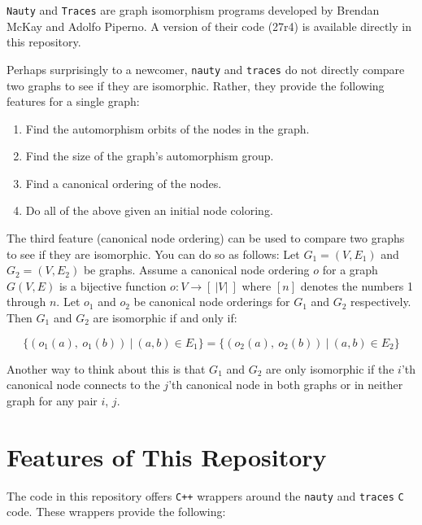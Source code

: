 \documentclass{article}
\begin{document}
\verb|Nauty| and \verb|Traces| are graph isomorphism programs developed by Brendan McKay and Adolfo Piperno. A version of their code (27r4) is available directly in this repository.

Perhaps surprisingly to a newcomer, \verb|nauty| and \verb|traces| do not directly compare two graphs to see if they are isomorphic. Rather, they provide the following features for a single graph:

\begin{enumerate}
    \item Find the automorphism orbits of the nodes in the graph.
    \item Find the size of the graph's automorphism group.
    \item Find a canonical ordering of the nodes.
    \item Do all of the above given an initial node coloring.
\end{enumerate}

The third feature (canonical node ordering) can be used to compare two graphs to see if they are isomorphic. You can do so as follows: Let $G_1 = (V, E_1)$ and $G_2 = (V, E_2)$ be graphs. Assume a canonical node ordering $o$ for a graph $G(V, E)$ is a bijective function $o: V \rightarrow [\ |V|\ ]$ where $[n]$ denotes the numbers 1 through $n$. Let $o_1$ and $o_2$ be canonical node orderings for $G_1$ and $G_2$ respectively. Then $G_1$ and $G_2$ are isomorphic if and only if:

$$\{(o_1(a),\ o_1(b))\ |\ (a, b) \in E_1\} = \{(o_2(a),\ o_2(b))\ |\ (a, b) \in E_2\}$$

Another way to think about this is that $G_1$ and $G_2$ are only isomorphic if the $i$'th canonical node connects to the $j$'th canonical node in both graphs or in neither graph for any pair $i$, $j$.

\section{Features of This Repository}\label{sec:features}

The code in this repository offers \verb|C++| wrappers around the \verb|nauty| and \verb|traces| \verb|C| code. These wrappers provide the following:
\end{document}
